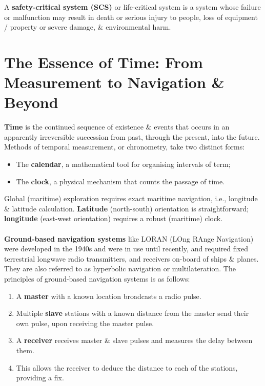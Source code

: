 \documentclass[a4paper,11pt]{article}
\begin{document}
A \textbf{safety-critical system (SCS)} or life-critical system is a system whose failure or malfunction may result in death or serious injury to people, loss of equipment / property or severe damage, \& environmental harm.

\section{The Essence of Time: From Measurement to Navigation \& Beyond}
\textbf{Time} is the continued sequence of existence \& events that occurs in an apparently irreversible succession from past, through the present, into the future.
Methods of temporal measurement, or chronometry, take two distinct forms:
\begin{itemize}
    \item   The \textbf{calendar}, a mathematical tool for organising intervals of term;
    \item   The \textbf{clock}, a physical mechanism that counts the passage of time.
\end{itemize}

Global (maritime) exploration requires exact maritime navigation, i.e., longitude \& latitude calculation.
\textbf{Latitude} (north-south) orientation is straightforward; \textbf{longitude} (east-west orientation) requires a robust (maritime) clock.
\\\\
\textbf{Ground-based navigation systems} like LORAN (LOng RAnge Navigation) were developed in the 1940s and were in use until recently, and required fixed terrestrial longwave radio transmitters, and receivers on-board of ships \& planes.
They are also referred to as hyperbolic navigation or multilateration.
The principles of ground-based navigation systems is as follows:
\begin{enumerate}
    \item   A \textbf{master} with a known location broadcasts a radio pulse.
    \item   Multiple \textbf{slave} stations with a known distance from the master send their own pulse, upon receiving the master pulse.
    \item   A \textbf{receiver} receives master \& slave pulses and measures the delay between them.
    \item   This allows the receiver to deduce the distance to each of the stations, providing a fix.
\end{enumerate}
\end{document}
